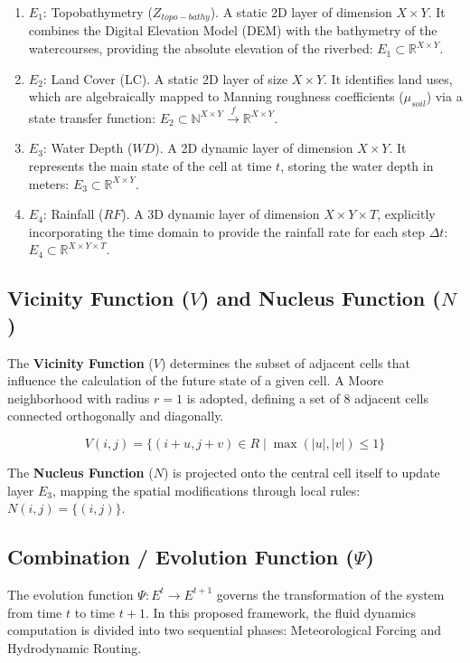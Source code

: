 \begin{enumerate}
    \item $E_1$: Topobathymetry ($Z_{topo-bathy}$). A static 2D layer of dimension $X \times Y$. It combines the Digital 
    Elevation Model (DEM) with the bathymetry of the watercourses, providing the absolute elevation of the riverbed: 
    $E_1 \subset \mathbb{R}^{X \times Y}$.
    \item $E_2$: Land Cover (LC). A static 2D layer of size $X \times Y$. It identifies land uses, which are algebraically 
    mapped to Manning roughness coefficients ($\mu_{soil}$) via a state transfer function: 
    $E_2 \subset \mathbb{N}^{X \times Y} \xrightarrow{f} \mathbb{R}^{X \times Y}$.
    \item $E_3$: Water Depth ($WD$). A 2D dynamic layer of dimension $X \times Y$. It represents the main state of the cell 
    at time $t$, storing the water depth in meters: $E_3 \subset \mathbb{R}^{X \times Y}$.
    \item $E_4$: Rainfall ($RF$). A 3D dynamic layer of dimension $X \times Y \times T$, explicitly incorporating the time 
    domain to provide the rainfall rate for each step $\Delta t$: $E_4 \subset \mathbb{R}^{X \times Y \times T}$.
\end{enumerate}


\subsection{Vicinity Function ($V$) and Nucleus Function ($N$)}

The \textbf{Vicinity Function} ($V$) determines the subset of adjacent cells that influence the calculation of the future state of a 
given cell. A Moore neighborhood with radius $r=1$ is adopted, defining a set of 8 adjacent cells connected orthogonally and 
diagonally.

$$V(i,j) = \{ (i+u, j+v) \in R \mid \max(|u|, |v|) \le 1 \}$$

The \textbf{Nucleus Function} ($N$) is projected onto the central cell itself to update layer $E_3$, mapping the spatial 
modifications through local rules: $N(i,j) = \{ (i,j) \}$.


\subsection{Combination / Evolution Function ($\Psi$)}

The evolution function $\Psi: E^t \rightarrow E^{t+1}$ governs the transformation of the system from time $t$ to time $t+1$. 
In this proposed framework, the fluid dynamics computation is divided into two sequential phases: Meteorological Forcing and 
Hydrodynamic Routing.


